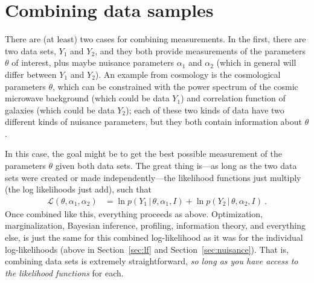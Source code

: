 \documentclass{article}
\newcommand{\sectionname}{Section}
\newcommand{\secref}[1]{\sectionname~\ref{#1}}
\newcommand{\given}{\,|\,}
\begin{document}
\section{Combining data samples}\label{sec:combining}
There are (at least) two cases for combining measurements.
In the first, there are two data sets, $Y_1$ and $Y_2$, and they both provide measurements of the parameters $\theta$ of interest, plus maybe nuisance parameters $\alpha_1$ and $\alpha_2$ (which in general will differ between $Y_1$ and $Y_2$).
An example from cosmology is the cosmological parameters $\theta$, which can be constrained with the power spectrum of the cosmic microwave background (which could be data $Y_1$) and correlation function of galaxies (which could be data $Y_2$); each of these two kinds of data have two different kinds of nuisance parameters, but they both contain information about $\theta$.

In this case, the goal might be to get the best possible measurement of the parameters $\theta$ given both data sets.
The great thing is---as long as the two data sets were created or made independently---the likelihood functions just multiply (the log likelihoods just add), such that
\begin{align}
    \mathscr{L}(\theta,\alpha_1,\alpha_2) &= \ln p(Y_1\given\theta,\alpha_1,I) + \ln p(Y_2\given\theta,\alpha_2,I) ~.\label{eq:combineLFs}
\end{align}
Once combined like this, everything proceeds as above.
Optimization, marginalization, Bayesian inference, profiling, information theory, and everything else, is just the same for this combined log-likelihood as it was for the individual log-likelihoods (above in \secref{sec:lf} and \secref{sec:nuisance}).
That is, combining data sets is extremely straightforward, \emph{so long as you have access to the likelihood functions} for each.
\end{document}
